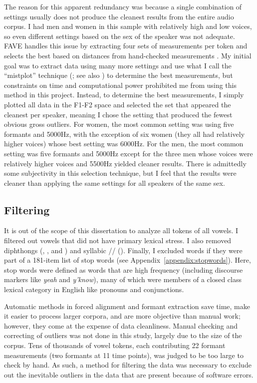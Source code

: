 The reason for this apparent redundancy was because a single combination of settings usually does not produce the cleanest results from the entire audio corpus. I had men and women in this sample with relatively high and low voices, so even different settings based on the sex of the speaker was not adequate. FAVE handles this issue by extracting four sets of measurements per token and selects the best based on distances from hand-checked measurements \citep[34--36]{labov_etal_2013}. My initial goal was to extract data using many more settings and use what I call the ``mistplot'' technique (\citealt{stanley_2018_mistplots}; see also \citealt{kendall_vaughn_2015}) to determine the best measurements, but constraints on time and computational power prohibited me from using this method in this project. Instead, to determine the best measurements, I simply plotted all data in the F1-F2 space and selected the set that appeared the cleanest per speaker, meaning I chose the setting that produced the fewest obvious gross outliers. For women, the most common setting was using five formants and 5000Hz, with the exception of six women (they all had relatively higher voices) whose best setting was 6000Hz. For the men, the most common setting was five formants and 5000Hz except for the three men whose voices were relatively higher voices and 5500Hz yielded cleaner results. There is admittedly some subjectivity in this selection technique, but I feel that the results were cleaner than applying the same settings for all speakers of the same sex.

\subsection{Filtering}
\label{filtering}

It is out of the scope of this dissertation to analyze all tokens of all vowels. I filtered out vowels that did not have primary lexical stress. I also removed diphthongs (\price, \mouth, and \choice) and syllabic /\textipa{\textrhookschwa}/ (\nurse). Finally, I excluded words if they were part of a 181-item list of stop words (see Appendix~\ref{appendix:stopwords}). Here, stop words were defined as words that are high frequency (including discourse markers like \textit{yeah} and \textit{y'know}), many of which were members of a closed class lexical category in English like pronouns and conjunctions.

Automatic methods in forced alignment and formant extraction save time, make it easier to process larger corpora, and are more objective than manual work; however, they come at the expense of data cleanliness. Manual checking and correcting of outliers was not done in this study, largely due to the size of the corpus. Tens of thousands of vowel tokens, each contributing 22 formant measurements (two formants at 11 time points), was judged to be too large to check by hand. As such, a method for filtering the data was necessary to exclude out the inevitable outliers in the data that are present because of software errors.

